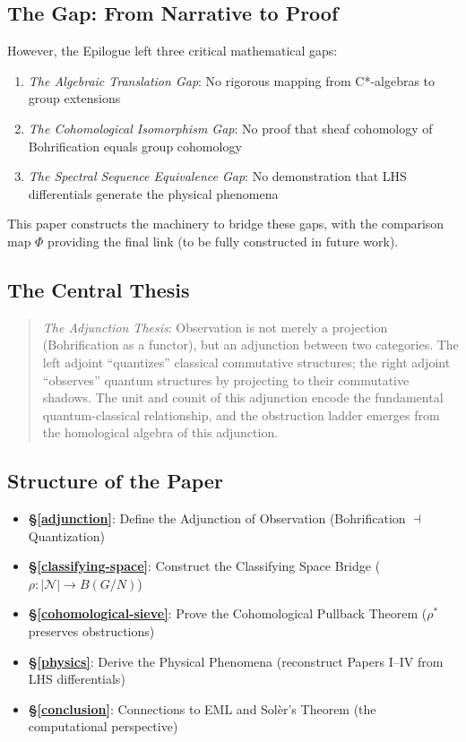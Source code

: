 \documentclass[11pt]{article}
\begin{document}
\subsection{The Gap: From Narrative to Proof}
\label{the-gap}

However, the Epilogue left three critical mathematical gaps:
\begin{enumerate}
\item \emph{The Algebraic Translation Gap}: No rigorous mapping from C*-algebras to group extensions
\item \emph{The Cohomological Isomorphism Gap}: No proof that sheaf cohomology of Bohrification equals group cohomology
\item \emph{The Spectral Sequence Equivalence Gap}: No demonstration that LHS differentials generate the physical phenomena
\end{enumerate}

This paper constructs the machinery to bridge these gaps, with the comparison map $\Phi$ providing the final link (to be fully constructed in future work).

\subsection{The Central Thesis}
\label{central-thesis}

\begin{quote}
\emph{The Adjunction Thesis}: Observation is not merely a projection (Bohrification as a functor), but an adjunction between two categories. The left adjoint ``quantizes'' classical commutative structures; the right adjoint ``observes'' quantum structures by projecting to their commutative shadows. The unit and counit of this adjunction encode the fundamental quantum-classical relationship, and the obstruction ladder emerges from the homological algebra of this adjunction.
\end{quote}

\subsection{Structure of the Paper}
\label{structure}

\begin{itemize}
\item \textbf{\S\ref{adjunction}}: Define the Adjunction of Observation (Bohrification $\dashv$ Quantization)
\item \textbf{\S\ref{classifying-space}}: Construct the Classifying Space Bridge ($\rho: |\mathcal{N}| \to B(G/N)$)
\item \textbf{\S\ref{cohomological-sieve}}: Prove the Cohomological Pullback Theorem ($\rho^*$ preserves obstructions)
\item \textbf{\S\ref{physics}}: Derive the Physical Phenomena (reconstruct Papers I--IV from LHS differentials)
\item \textbf{\S\ref{conclusion}}: Connections to EML and Sol\`{e}r's Theorem (the computational perspective)
\end{itemize}
\end{document}
